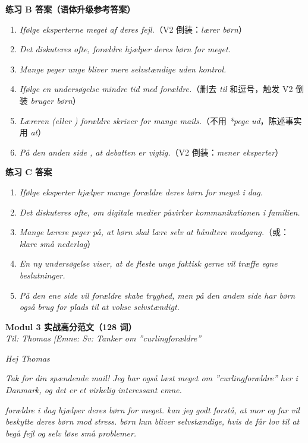 \begin{answerbox}
\textbf{练习 B 答案（语体升级参考答案）}
\begin{enumerate}
  \item \textit{Ifølge eksperterne  meget af deres fejl.}（V2 倒装：\textit{lærer børn}）
  \item \textit{Det diskuteres ofte,  forældre hjælper deres børn for meget.}
  \item \textit{Mange peger  unge bliver mere selvstændige uden kontrol.}
  \item \textit{Ifølge en undersøgelse  mindre tid med forældre.}（删去 \textit{til} 和逗号，触发 V2 倒装 \textit{bruger børn}）
  \item \textit{Læreren  (eller ) forældre skriver for mange mails.}（不用 \textit{*pege ud}，陈述事实用 \textit{at}）
  \item \textit{På den anden side , at debatten er vigtig.}（V2 倒装：\textit{mener eksperter}）
\end{enumerate}

\textbf{练习 C 答案}
\begin{enumerate}
  \item \textit{Ifølge eksperter hjælper mange forældre deres børn for meget i dag.}
  \item \textit{Det diskuteres ofte, om digitale medier påvirker kommunikationen i familien.}
  \item \textit{Mange lærere peger på, at børn skal lære selv at håndtere modgang.}（或：\textit{klare små nederlag}）
  \item \textit{En ny undersøgelse viser, at de fleste unge faktisk gerne vil træffe egne beslutninger.}
  \item \textit{På den ene side vil forældre skabe tryghed, men på den anden side har børn også brug for plads til at vokse selvstændigt.}
\end{enumerate}

\textbf{Modul 3 实战高分范文（128 词）}\\
\textit{Til: Thomas \quad|\quad Emne: Sv: Tanker om ”curlingforældre”}

\textit{Hej Thomas}

\textit{Tak for din spændende mail! Jeg har også læst meget om ”curlingforældre” her i Danmark, og det er et virkelig interessant emne.}

\textit{ forældre i dag hjælper deres børn for meget.  kan jeg godt forstå, at mor og far vil beskytte deres børn mod stress.  børn kun bliver selvstændige, hvis de får lov til at begå fejl og selv løse små problemer.}


\end{answerbox}
